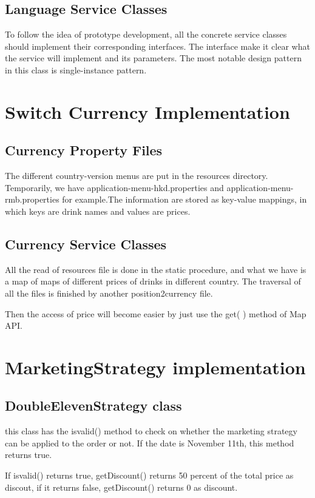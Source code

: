\documentclass[a4paper]{report}
\begin{document}
\subsection{Language Service Classes }
\par To follow the idea of prototype development, all the concrete service classes should implement their corresponding interfaces. The interface make it clear what the service will implement and its parameters. The most notable design pattern in this class is single-instance pattern.

\section{Switch Currency Implementation}
\subsection{Currency Property Files}
\par The different country-version menus are put in the resources directory. Temporarily, we have application-menu-hkd.properties and application-menu-rmb.properties for example.The information are stored as key-value mappings, in which keys are drink names and values are prices. 
\subsection{Currency Service Classes}
\par All the read of resources file is done in the static procedure, and what we have is a map of maps of different prices of drinks in different country. The traversal of all the files is finished by another position2currency file.
\par Then the  access of price will become easier by just use the get( ) method of Map API. 

\section{MarketingStrategy implementation}
\subsection{DoubleElevenStrategy class}
\par this class has the isvalid() method to check on whether the marketing strategy can be applied to the order or not.  If the date is November 11th, this method returns true.
\par If isvalid() returns true, getDiscount() returns 50 percent of the total price as discout, if it returns false, getDiscount() returns 0 as discount.
\end{document}
